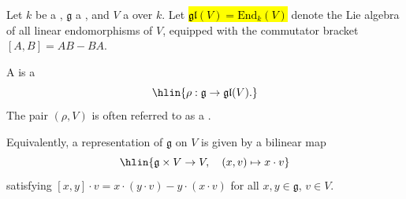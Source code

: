 \begin{definition} \label{definition:representation_of_a_lie_algebra_on_a_vector_space_over_a_field}

    Let $k$ be a , $\mathfrak{g}$ a , and $V$ a  over $k$. Let \hl{$\mathfrak{gl}(V) = \mathrm{End}_k(V)$} denote the Lie algebra of all linear endomorphisms of $V$, equipped with the commutator bracket $[A, B] = AB - BA$.

    A  is a 
    $$\hlin{\rho : \mathfrak{g} \to \mathfrak{gl}(V).}$$
    The pair $(\rho, V)$ is often referred to as a .

    Equivalently, a representation of $\mathfrak{g}$ on $V$ is given by a bilinear map
    $$\hlin{\mathfrak{g} \times V \to V, \quad (x, v) \mapsto x \cdot v}$$
    satisfying $[x, y] \cdot v = x \cdot (y \cdot v) - y \cdot (x \cdot v)$ for all $x, y \in \mathfrak{g}$, $v \in V$.
\end{definition}
